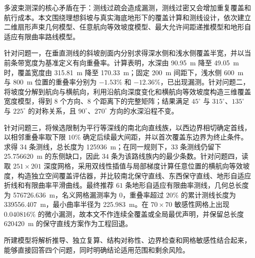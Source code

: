 
\begin{cnabstract}
多波束测深的核心矛盾在于：测线过疏会造成漏测，测线过密又会增加重复覆盖和航行成本。本文围绕理想斜坡与真实海底地形下的覆盖计算和测线设计，依次建立二维扇形声束几何模型、任意航向等效坡度模型、最大允许间距递推模型和地形自适应有限曲率路线模型。

针对问题一，在垂直测线的斜坡剖面内分别求得深水侧和浅水侧覆盖半宽，并以当前条带宽度为基准定义有向重叠率。计算表明，水深由 \SI{90.95}{m} 降至 \SI{49.05}{m} 时，覆盖宽度由 \SI{315.81}{m} 降至 \SI{170.33}{m}；固定 \SI{200}{m} 间距下，浅水侧 \SI{600}{m} 与 \SI{800}{m} 位置的重叠率分别为 $-1.53\%$ 和 $-12.36\%$，已出现漏测。针对问题二，将坡度分解到航向与横航向，利用沿航向深度变化和横航向等效坡度构造三维覆盖宽度模型，得到 $8$ 个方向、$8$ 个距离下的完整矩阵；结果满足 $45^\circ$ 与 $315^\circ$、$135^\circ$ 与 $225^\circ$ 的对称关系，且 $90^\circ$、$270^\circ$ 方向的水深沿程不变。

针对问题三，将候选限制为平行等深线的南北向直线族，以西边界相切确定首线，以相邻重叠率取下限 $10\%$ 确定后续最大间距，并以首次覆盖东边界为终止条件。求得 $34$ 条测线，总长度为 \SI{125936}{m}；在同一规则下，$33$ 条测线仍留下 \SI{25.756620}{m} 的东侧缺口，因此 $34$ 条为该路线族内的最少条数。针对问题四，读取 $251\times201$ 深度网格，采用双线性插值与局部梯度计算任意位置的横航向等效坡度，构造独立空间覆盖评估器，并比较南北保守直线、东西保守直线、地形自适应折线和有限曲率平滑曲线。最终推荐 $61$ 条地形自适应有限曲率测线，几何总长度为 \SI{576726.636}{m}，名义网格漏测率为 $0$，重叠率超过 $20\%$ 的累计测线长度为 \SI{339556.407}{m}，最小曲率半径为 \SI{225.983}{m}。在 $70\times70$ 敏感性网格上出现 $0.040816\%$ 的微小漏测，故本文不作连续全覆盖或全局最优声明，并保留总长度 \SI{620420}{m} 的保守直线方案作为工程回退。

所建模型将解析推导、独立复算、结构对称性、边界检查和网格敏感性结合起来，能够直接回答四个问题，同时明确结论适用范围和剩余风险。
\end{cnabstract}


\clearpage
